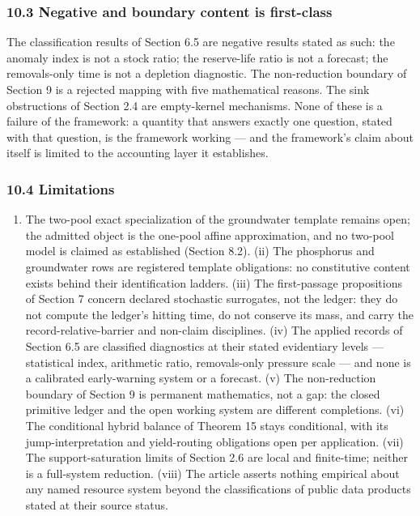 \documentclass[11pt]{article}
\providecommand{\tightlist}{\setlength{\itemsep}{0pt}\setlength{\parskip}{0pt}}
\begin{document}
\subsubsection{10.3 Negative and boundary content is
first-class}\label{negative-and-boundary-content-is-first-class}

The classification results of Section 6.5 are negative results stated as
such: the anomaly index is not a stock ratio; the reserve-life ratio is
not a forecast; the removals-only time is not a depletion diagnostic.
The non-reduction boundary of Section 9 is a rejected mapping with five
mathematical reasons. The sink obstructions of Section 2.4 are
empty-kernel mechanisms. None of these is a failure of the framework: a
quantity that answers exactly one question, stated with that question,
is the framework working --- and the framework's claim about itself is
limited to the accounting layer it establishes.

\subsubsection{10.4 Limitations}\label{limitations}

\begin{enumerate}
\def\labelenumi{(\roman{enumi})}
\tightlist
\item
  The two-pool exact specialization of the groundwater template remains
  open; the admitted object is the one-pool affine approximation, and no
  two-pool model is claimed as established (Section 8.2). (ii) The
  phosphorus and groundwater rows are registered template obligations:
  no constitutive content exists behind their identification ladders.
  (iii) The first-passage propositions of Section 7 concern declared
  stochastic surrogates, not the ledger: they do not compute the
  ledger's hitting time, do not conserve its mass, and carry the
  record-relative-barrier and non-claim disciplines. (iv) The applied
  records of Section 6.5 are classified diagnostics at their stated
  evidentiary levels --- statistical index, arithmetic ratio,
  removals-only pressure scale --- and none is a calibrated
  early-warning system or a forecast. (v) The non-reduction boundary of
  Section 9 is permanent mathematics, not a gap: the closed primitive
  ledger and the open working system are different completions. (vi) The
  conditional hybrid balance of Theorem 15 stays conditional, with its
  jump-interpretation and yield-routing obligations open per
  application. (vii) The support-saturation limits of Section 2.6 are
  local and finite-time; neither is a full-system reduction. (viii) The
  article asserts nothing empirical about any named resource system
  beyond the classifications of public data products stated at their
  source status.
\end{enumerate}
\end{document}
